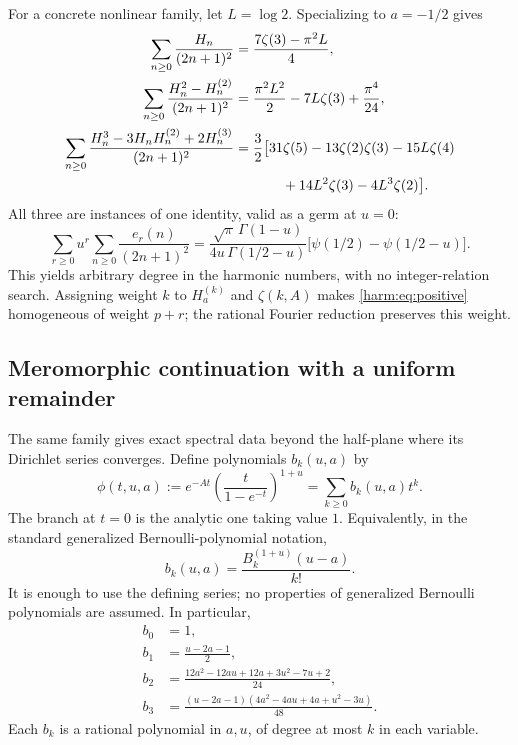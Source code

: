 For a concrete nonlinear family, let $L=\log2$.  Specializing to
$a=-1/2$ gives
\begin{align}
 \sum_{n\geq0}\frac{H_n}{(2n+1)^2}
 &=\frac{7\zeta(3)-\pi^2L}{4},\label{harm:eq:odd1}\\
 \sum_{n\geq0}\frac{H_n^2-H_n^{(2)}}{(2n+1)^2}
 &=\frac{\pi^2L^2}{2}-7L\zeta(3)+\frac{\pi^4}{24},
                       \label{harm:eq:odd2}\\
 \sum_{n\geq0}\frac{H_n^3-3H_nH_n^{(2)}+2H_n^{(3)}}{(2n+1)^2}
 &=\frac32\bigl[31\zeta(5)-13\zeta(2)\zeta(3)-15L\zeta(4)
             \notag\\
 &\hspace{1.2cm}+14L^2\zeta(3)-4L^3\zeta(2)\bigr].
                       \label{harm:eq:odd3}
\end{align}
All three are instances of one identity, valid as a germ at $u=0$:
\begin{equation}\label{harm:eq:oddall}
 \sum_{r\geq0}u^r\sum_{n\geq0}\frac{e_r(n)}{(2n+1)^2}
 =\frac{\sqrt\pi\,\Gamma(1-u)}{4u\,\Gamma(1/2-u)}
       \bigl[\psi(1/2)-\psi(1/2-u)\bigr].
\end{equation}
This yields arbitrary degree in the harmonic numbers, with no
integer-relation search.  Assigning weight $k$ to $H_a^{(k)}$ and
$\zeta(k,A)$ makes \eqref{harm:eq:positive} homogeneous of weight
$p+r$; the rational Fourier reduction preserves this weight.

\subsection{Meromorphic continuation with a uniform remainder}

The same family gives exact spectral data beyond the half-plane where
its Dirichlet series converges.  Define polynomials $b_k(u,a)$ by
\begin{equation}\label{harm:eq:bdef}
 \phi(t,u,a):=e^{-At}
       \left(\frac{t}{1-e^{-t}}\right)^{1+u}
       =\sum_{k\geq0}b_k(u,a)t^k.
\end{equation}
The branch at $t=0$ is the analytic one taking value $1$.  Equivalently,
in the standard generalized Bernoulli-polynomial notation,
\[
 b_k(u,a)=\frac{B_k^{(1+u)}(u-a)}{k!}.
\]
It is enough to use the defining series; no properties of generalized
Bernoulli polynomials are assumed.  In particular,
\begin{align}
 b_0&=1,\\
 b_1&=\frac{u-2a-1}{2},\label{harm:eq:b1}\\
 b_2&=\frac{12a^2-12au+12a+3u^2-7u+2}{24},\label{harm:eq:b2}\\
 b_3&=\frac{(u-2a-1)(4a^2-4au+4a+u^2-3u)}{48}.
                       \label{harm:eq:b3}
\end{align}
Each $b_k$ is a rational polynomial in $a,u$, of degree at most $k$
in each variable.

